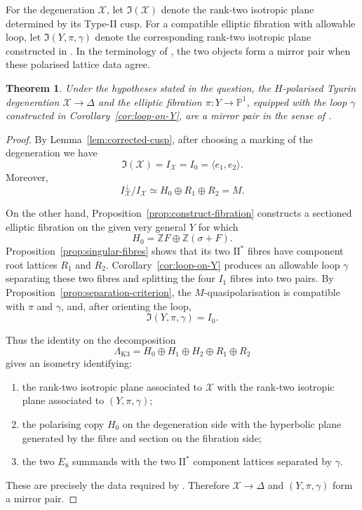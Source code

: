 \documentclass[11pt]{amsart}
\newtheorem{theorem}{Theorem}[section]
\theoremstyle{definition}
\newcommand{\cX}{\mathcal X}
\newcommand{\DD}{\Delta}
\newcommand{\PP}{\mathbb P}
\newcommand{\ZZ}{\mathbb Z}
\newcommand{\frI}{\mathfrak I}
\begin{document}
For the degeneration $\cX$, let $\frI(\cX)$ denote the rank-two isotropic
plane determined by its Type-II cusp.  For a compatible elliptic fibration
with allowable loop, let $\frI(Y,\pi,\gamma)$ denote the corresponding
rank-two isotropic plane constructed in \cite[Section~4]{GT24}.  In the
terminology of \cite[Definition~5.1]{GT24}, the two objects form a mirror
pair when these polarised lattice data agree.

\begin{theorem}\label{thm:main}
Under the hypotheses stated in the question, the $H$-polarised Tyurin
degeneration $\cX\to\DD$ and the elliptic fibration
$\pi\colon Y\to\PP^1$, equipped with the loop $\gamma$ constructed in
Corollary~\ref{cor:loop-on-Y}, are a mirror pair in the sense of
\cite[Definition~5.1]{GT24}.
\end{theorem}

\begin{proof}
By Lemma~\ref{lem:corrected-cusp}, after choosing a marking of the
degeneration we have
\[
\frI(\cX)=I_{\cX}=I_0=\langle e_1,e_2\rangle.
\]
Moreover,
\[
I_{\cX}^{\perp}/I_{\cX}\simeq H_0\oplus R_1\oplus R_2=M.
\]

On the other hand, Proposition~\ref{prop:construct-fibration} constructs a
sectioned elliptic fibration on the given very general $Y$ for which
\[
H_0=\ZZ F\oplus\ZZ(\sigma+F).
\]
Proposition~\ref{prop:singular-fibres} shows that its two $\mathrm{II}^*$
fibres have component root lattices $R_1$ and $R_2$.
Corollary~\ref{cor:loop-on-Y} produces an allowable loop $\gamma$ separating
these two fibres and splitting the four $I_1$ fibres into two pairs.  By
Proposition~\ref{prop:separation-criterion}, the $M$-quasipolarisation is
compatible with $\pi$ and $\gamma$, and, after orienting the loop,
\[
\frI(Y,\pi,\gamma)=I_0.
\]

Thus the identity on the decomposition
\[
\Lambda_{\mathrm{K3}}
 =
H_0\oplus H_1\oplus H_2\oplus R_1\oplus R_2
\]
gives an isometry identifying:
\begin{enumerate}[label=\textup{(\arabic*)}]
\item the rank-two isotropic plane associated to $\cX$ with the rank-two
isotropic plane associated to $(Y,\pi,\gamma)$;
\item the polarising copy $H_0$ on the degeneration side with the hyperbolic
plane generated by the fibre and section on the fibration side;
\item the two $E_8$ summands with the two $\mathrm{II}^*$ component
lattices separated by $\gamma$.
\end{enumerate}
These are precisely the data required by
\cite[Definition~5.1]{GT24}.  Therefore $\cX\to\DD$ and
$(Y,\pi,\gamma)$ form a mirror pair.
\end{proof}
\end{document}
